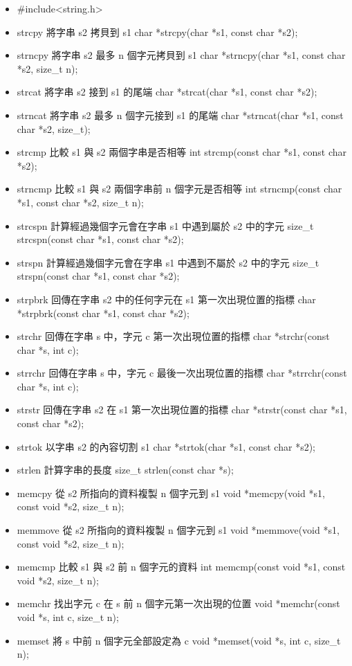 \begin{itemize}
\item #include<string.h>

\item strcpy	將字串 s2 拷貝到 s1	char *strcpy(char *s1, const char *s2);
\item strncpy	將字串 s2 最多 n 個字元拷貝到 s1	char *strncpy(char *s1, const char *s2, size_t n);
\item strcat	將字串 s2 接到 s1 的尾端	char *strcat(char *s1, const char *s2);
\item strncat	將字串 s2 最多 n 個字元接到 s1 的尾端	char *strncat(char *s1, const char *s2, size_t);
\item strcmp	比較 s1 與 s2 兩個字串是否相等	int strcmp(const char *s1, const char *s2);
\item strncmp	比較 s1 與 s2 兩個字串前 n 個字元是否相等	int strncmp(const char *s1, const char *s2, size_t n);
\item strcspn	計算經過幾個字元會在字串 s1 中遇到屬於 s2 中的字元	size_t strcspn(const char *s1, const char *s2);
\item strspn	計算經過幾個字元會在字串 s1 中遇到不屬於 s2 中的字元	size_t strspn(const char *s1, const char *s2);
\item strpbrk	回傳在字串 s2 中的任何字元在 s1 第一次出現位置的指標	char *strpbrk(const char *s1, const char *s2);
\item strchr	回傳在字串 s 中，字元 c 第一次出現位置的指標	char *strchr(const char *s, int c);
\item strrchr	回傳在字串 s 中，字元 c 最後一次出現位置的指標	char *strrchr(const char *s, int c);
\item strstr	回傳在字串 s2 在 s1 第一次出現位置的指標	char *strstr(const char *s1, const char *s2);
\item strtok	以字串 s2 的內容切割 s1	char *strtok(char *s1, const char *s2);
\item strlen	計算字串的長度	size_t strlen(const char *s);

\item memcpy	從 s2 所指向的資料複製 n 個字元到 s1	void *memcpy(void *s1, const void *s2, size_t n);
\item memmove	從 s2 所指向的資料複製 n 個字元到 s1	void *memmove(void *s1, const void *s2, size_t n);
\item memcmp	比較 s1 與 s2 前 n 個字元的資料	int memcmp(const void *s1, const void *s2, size_t n);
\item memchr	找出字元 c 在 s 前 n 個字元第一次出現的位置	void *memchr(const void *s, int c, size_t n);
\item memset	將 s 中前 n 個字元全部設定為 c	void *memset(void *s, int c, size_t n);
\end{itemize}